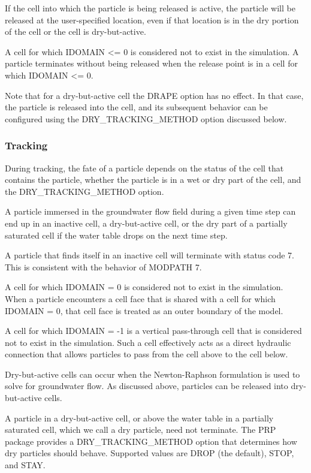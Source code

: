 If the cell into which the particle is being released is active, the particle will be released at the user-specified location, even if that location is in the dry portion of the cell or the cell is dry-but-active.

A cell for which IDOMAIN <= 0 is considered not to exist in the simulation. A particle terminates without being released when the release point is in a cell for which IDOMAIN <= 0.

Note that for a dry-but-active cell the DRAPE option has no effect. In that case, the particle is released into the cell, and its subsequent behavior can be configured using the DRY\_TRACKING\_METHOD option discussed below.

\subsubsection{Tracking}

During tracking, the fate of a particle depends on the status of the cell that contains the particle, whether the particle is in a wet or dry part of the cell, and the DRY\_TRACKING\_METHOD option.

A particle immersed in the groundwater flow field during a given time step can end up in an inactive cell, a dry-but-active cell, or the dry part of a partially saturated cell if the water table drops on the next time step.

A particle that finds itself in an inactive cell will terminate with status code 7. This is consistent with the behavior of MODPATH 7.

A cell for which IDOMAIN = 0 is considered not to exist in the simulation. When a particle encounters a cell face that is shared with a cell for which IDOMAIN = 0, that cell face is treated as an outer boundary of the model.

A cell for which IDOMAIN = -1 is a vertical pass-through cell that is considered not to exist in the simulation. Such a cell effectively acts as a direct hydraulic connection that allows particles to pass from the cell above to the cell below.

Dry-but-active cells can occur when the Newton-Raphson formulation is used to solve for groundwater flow. As discussed above, particles can be released into dry-but-active cells.

A particle in a dry-but-active cell, or above the water table in a partially saturated cell, which we call a dry particle, need not terminate. The PRP package provides a DRY\_TRACKING\_METHOD option that determines how dry particles should behave. Supported values are DROP (the default), STOP, and STAY.

